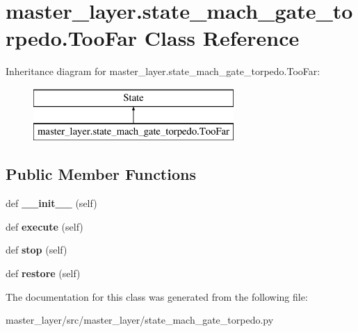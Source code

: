 \hypertarget{classmaster__layer_1_1state__mach__gate__torpedo_1_1TooFar}{}\section{master\+\_\+layer.\+state\+\_\+mach\+\_\+gate\+\_\+torpedo.\+Too\+Far Class Reference}
\label{classmaster__layer_1_1state__mach__gate__torpedo_1_1TooFar}
Inheritance diagram for master\+\_\+layer.\+state\+\_\+mach\+\_\+gate\+\_\+torpedo.\+Too\+Far\+:\begin{figure}[H]
\begin{center}
\leavevmode
\includegraphics[height=2.000000cm]{classmaster__layer_1_1state__mach__gate__torpedo_1_1TooFar}
\end{center}
\end{figure}
\subsection*{Public Member Functions}
\begin{DoxyCompactItemize}
\item 
\mbox{\label{classmaster__layer_1_1state__mach__gate__torpedo_1_1TooFar_a9e8366790b60fd0292f05ab079977d8d}} 
def {\bfseries \+\_\+\+\_\+init\+\_\+\+\_\+} (self)
\item 
\mbox{\label{classmaster__layer_1_1state__mach__gate__torpedo_1_1TooFar_a8ce0674a7ab6ea004c1312a75a24f997}} 
def {\bfseries execute} (self)
\item 
\mbox{\label{classmaster__layer_1_1state__mach__gate__torpedo_1_1TooFar_a8a4d2de16fd02ec2add5690d92a47f7d}} 
def {\bfseries stop} (self)
\item 
\mbox{\label{classmaster__layer_1_1state__mach__gate__torpedo_1_1TooFar_a9343ff5a19ad5b19148df2ba00802558}} 
def {\bfseries restore} (self)
\end{DoxyCompactItemize}


The documentation for this class was generated from the following file\+:\begin{DoxyCompactItemize}
\item 
master\+\_\+layer/src/master\+\_\+layer/state\+\_\+mach\+\_\+gate\+\_\+torpedo.\+py\end{DoxyCompactItemize}
